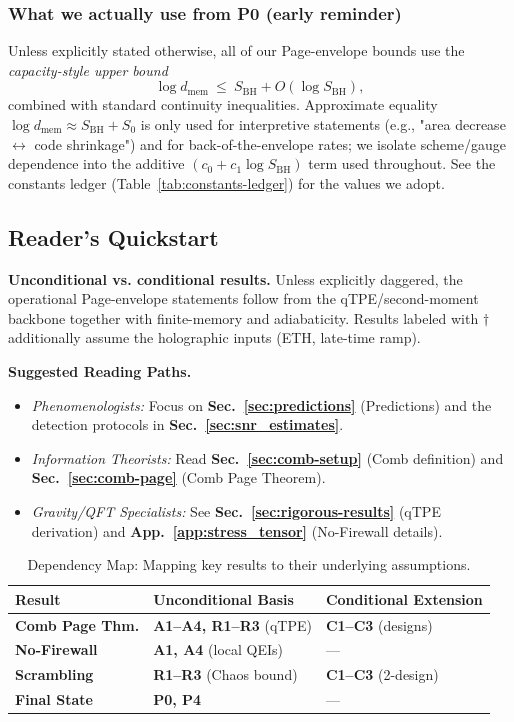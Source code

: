 \documentclass[aps,prd,preprint,onecolumn,superscriptaddress,nofootinbib,longbibliography,floatfix,11pt,showpacs,showkeys]{revtex4-2}
\theoremstyle{plain}
\theoremstyle{definition}
\theoremstyle{remark}
\begin{document}
\subsubsection{What we actually use from P0 (early reminder)}
Unless explicitly stated otherwise, all of our Page-envelope bounds use the
 \emph{capacity-style upper bound}
\[
 \log d_{\mathrm{mem}} \ \le\  S_{\mathrm{BH}} + O(\log S_{\mathrm{BH}})\!,
\]
combined with standard continuity inequalities.
Approximate equality $\log d_{\mathrm{mem}}\approx S_{\mathrm{BH}}+S_0$ is only used
for interpretive statements (e.g., "area decrease $\leftrightarrow$ code shrinkage")
and for back-of-the-envelope rates; we isolate scheme/gauge dependence into the
additive $(c_0+c_1\log S_{\mathrm{BH}})$ term used throughout.  See the
constants ledger (Table~\ref{tab:constants-ledger}) for the values we adopt.

\subsection{Reader's Quickstart}
\label{sec:quickstart}
\noindent\textbf{Unconditional vs. conditional results.}
Unless explicitly daggered, the operational Page-envelope statements follow from the qTPE/second-moment backbone together with finite-memory and adiabaticity. Results labeled with \(\dagger\) additionally assume the holographic inputs (ETH, late-time ramp).

\noindent\textbf{Suggested Reading Paths.}
\begin{itemize}
    \item \emph{Phenomenologists:} Focus on \textbf{Sec.~\ref{sec:predictions}} (Predictions) and the detection protocols in \textbf{Sec.~\ref{sec:snr_estimates}}.
    \item \emph{Information Theorists:} Read \textbf{Sec.~\ref{sec:comb-setup}} (Comb definition) and \textbf{Sec.~\ref{sec:comb-page}} (Comb Page Theorem).
    \item \emph{Gravity/QFT Specialists:} See \textbf{Sec.~\ref{sec:rigorous-results}} (qTPE derivation) and \textbf{App.~\ref{app:stress_tensor}} (No-Firewall details).
\end{itemize}

\begin{table}[hbtp]
\centering
\small
\begin{tabular*}{\textwidth}{@{\extracolsep{\fill}}lll@{}}
\toprule
\textbf{Result} & \textbf{Unconditional Basis} & \textbf{Conditional Extension} \\
\midrule
\textbf{Comb Page Thm.} & \textbf{A1--A4, R1--R3} (qTPE) & \textbf{C1--C3} (designs) \\
\addlinespace
\textbf{No-Firewall} & \textbf{A1, A4} (local QEIs) & --- \\
\addlinespace
\textbf{Scrambling} & \textbf{R1--R3} (Chaos bound) & \textbf{C1--C3} (2-design) \\
\addlinespace
\textbf{Final State} & \textbf{P0, P4} & --- \\
\bottomrule
\end{tabular*}
\caption{Dependency Map: Mapping key results to their underlying assumptions.}
\label{tab:dependency_map_summary}
\end{table}
\end{document}
